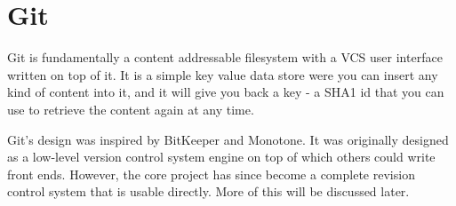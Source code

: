 \section{Git}

Git is fundamentally a content addressable filesystem with a VCS user
interface written on top of it. It is a simple key value data store
were you can insert any kind of content into it, and it will give you
back a key - a SHA1 id that you can use to retrieve the content again
at any time.

Git’s design was inspired by BitKeeper and Monotone\cite{inspiration}.
It was originally designed as a low-level version control system
engine on top of which others could write front ends. However, the
core project has since become a complete revision control system that
is usable directly. More of this will be discussed later.
